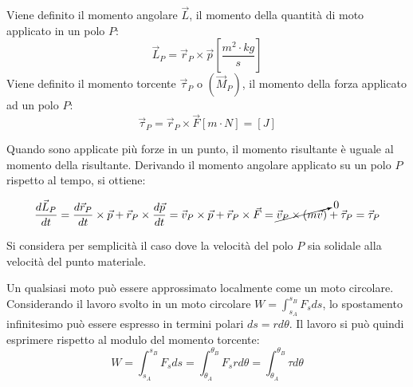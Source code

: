 \documentclass{article}
\numberwithin{equation}{subsection}
\begin{document}
\begin{center}\end{center}

Viene definito il momento angolare $\vec{L}$, il momento della 
quantità di moto applicato in un polo $P$:
\begin{equation} 
    \vec{L}_P=\vec{r}_P\times\vec{p}\left[\displaystyle\frac{m^2\cdot kg}{s}\right]
\end{equation}
Viene definito il momento torcente $\vec{\tau}_P$ o $(\vec{M}_P)$, il momento della forza applicato 
ad un polo $P$:
\begin{equation}
    \vec{\tau}_P=\vec{r}_P\times\vec{F}\left[m\cdot N\right]=[J]
\end{equation}

Quando sono applicate più forze in un punto, il momento risultante è uguale al momento della risultante. 
Derivando il momento angolare applicato su un polo $P$ rispetto al tempo, si ottiene: 

\begin{equation}
    \displaystyle\frac{d\vec{L}_P}{dt}=\frac{d\vec{r}_P}{dt}\times\vec{p}+\vec{r}_P\times\frac{d\vec{p}}{dt}=\vec{v}_P\times\vec{p}+\vec{r}_P\times\vec{F}=\cancelto{0}{\vec{v}_P\times(m\vec{v})}+\vec{\tau}_P=\vec{\tau}_P
\end{equation}

Si considera per semplicità il caso dove la velocità del polo $P$ sia solidale alla velocità del punto materiale. 


Un qualsiasi moto può essere approssimato localmente come un moto circolare. Considerando il lavoro svolto in un moto circolare $W=\displaystyle\int_{s_A}^{s_B}{F}_s ds$, lo spostamento infinitesimo può essere espresso 
in termini polari $ds=rd\theta$. Il lavoro si può quindi esprimere rispetto al modulo del momento torcente: 
\begin{equation*}
    W=\displaystyle\int_{s_A}^{s_B}{F}_s ds=\int_{\theta_A}^{\theta_B}F_srd\theta=\int_{\theta_A}^{\theta_B}\tau d\theta
\end{equation*}
\end{document}
